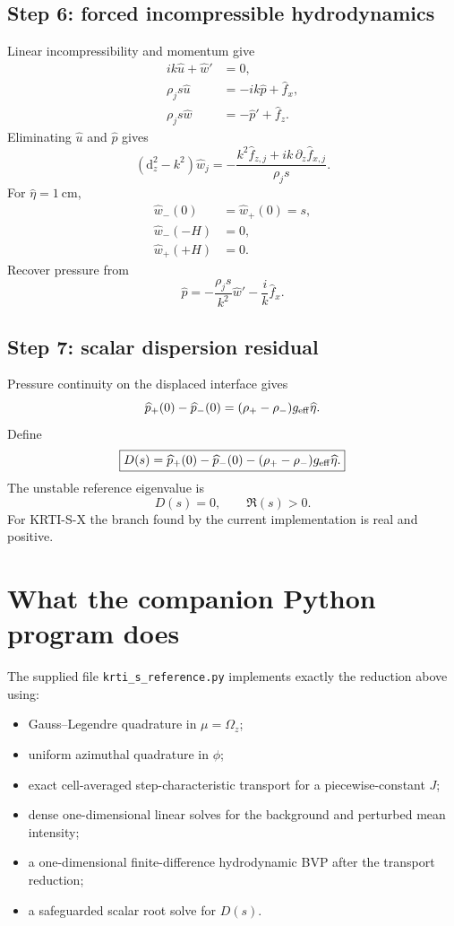 \documentclass[11pt]{article}
\newcommand{\dd}{\mathrm{d}}
\newcommand{\whatv}{\widehat w}
\newcommand{\uhat}{\widehat u}
\newcommand{\phat}{\widehat p}
\begin{document}
\subsection{Step 6: forced incompressible hydrodynamics}
Linear incompressibility and momentum give
\begin{align}
ik\uhat+\whatv'&=0,\\
\rho_js\uhat&=-ik\phat+\widehat f_x,\\
\rho_js\whatv&=-\phat'+\widehat f_z.
\end{align}
Eliminating $\uhat$ and $\phat$ gives
\begin{equation}
\boxed{
(\dd_z^2-k^2)\whatv_j
=-\frac{k^2\widehat f_{z,j}+ik\,\partial_z\widehat f_{x,j}}{\rho_js}.
}
\end{equation}
For $\widehat\eta=1\ \mathrm{cm}$,
\begin{align}
\whatv_-(0)&=\whatv_+(0)=s,\\
\whatv_-(-H)&=0,\\
\whatv_+(+H)&=0.
\end{align}
Recover pressure from
\begin{equation}
\boxed{\phat=-\frac{\rho_js}{k^2}\whatv'-\frac{i}{k}\widehat f_x.}
\end{equation}

\subsection{Step 7: scalar dispersion residual}
Pressure continuity on the displaced interface gives
\begin{equation}
\phat_+(0)-\phat_-(0)=(\rho_+-\rho_-)g_{\rm eff}\widehat\eta.
\end{equation}
Define
\begin{equation}
\boxed{D(s)=\phat_+(0)-\phat_-(0)-(\rho_+-\rho_-)g_{\rm eff}\widehat\eta.}
\end{equation}
The unstable reference eigenvalue is
\begin{equation}
\boxed{D(s)=0,\qquad \Re(s)>0.}
\end{equation}
For KRTI-S-X the branch found by the current implementation is real and positive.

\section{What the companion Python program does}
The supplied file \texttt{krti\_s\_reference.py} implements exactly the reduction above using:
\begin{itemize}[leftmargin=2em]
\item Gauss--Legendre quadrature in $\mu=\Omega_z$;
\item uniform azimuthal quadrature in $\phi$;
\item exact cell-averaged step-characteristic transport for a piecewise-constant $J$;
\item dense one-dimensional linear solves for the background and perturbed mean intensity;
\item a one-dimensional finite-difference hydrodynamic BVP after the transport reduction;
\item a safeguarded scalar root solve for $D(s)$.
\end{itemize}
\end{document}
